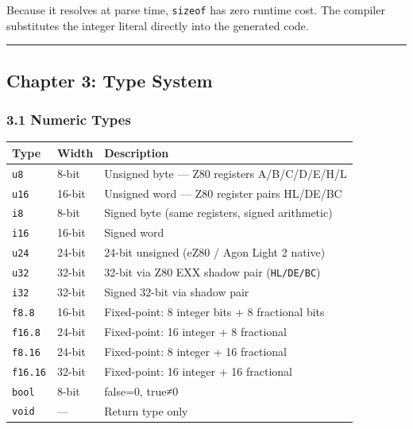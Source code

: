 \documentclass[
  11pt,
]{article}
\begin{document}
Because it resolves at parse time, \texttt{sizeof} has zero runtime
cost. The compiler substitutes the integer literal directly into the
generated code.

\begin{center}\rule{0.5\linewidth}{0.5pt}\end{center}

\hypertarget{chapter-3-type-system}{%
\subsection{Chapter 3: Type System}\label{chapter-3-type-system}}

\hypertarget{numeric-types}{%
\subsubsection{3.1 Numeric Types}\label{numeric-types}}

\begin{longtable}[]{@{}lll@{}}
\toprule\noalign{}
Type & Width & Description \\
\midrule\noalign{}
\endhead
\bottomrule\noalign{}
\endlastfoot
\texttt{u8} & 8-bit & Unsigned byte --- Z80 registers A/B/C/D/E/H/L \\
\texttt{u16} & 16-bit & Unsigned word --- Z80 register pairs HL/DE/BC \\
\texttt{i8} & 8-bit & Signed byte (same registers, signed arithmetic) \\
\texttt{i16} & 16-bit & Signed word \\
\texttt{u24} & 24-bit & 24-bit unsigned (eZ80 / Agon Light 2 native) \\
\texttt{u32} & 32-bit & 32-bit via Z80 EXX shadow pair
(\texttt{HL\textquotesingle{}/DE\textquotesingle{}/BC\textquotesingle{}}) \\
\texttt{i32} & 32-bit & Signed 32-bit via shadow pair \\
\texttt{f8.8} & 16-bit & Fixed-point: 8 integer bits + 8 fractional
bits \\
\texttt{f16.8} & 24-bit & Fixed-point: 16 integer + 8 fractional \\
\texttt{f8.16} & 24-bit & Fixed-point: 8 integer + 16 fractional \\
\texttt{f16.16} & 32-bit & Fixed-point: 16 integer + 16 fractional \\
\texttt{bool} & 8-bit & false=0, true≠0 \\
\texttt{void} & --- & Return type only \\
\end{longtable}
\end{document}
